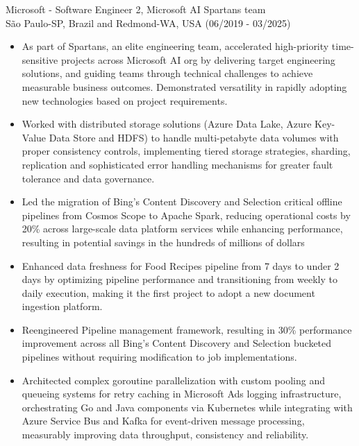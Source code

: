 
\normalsize{Microsoft - Software Engineer 2, Microsoft AI Spartans team}\\
    \scriptsize{São Paulo-SP, Brazil and Redmond-WA, USA (06/2019 - 03/2025)}
\begin{itemize}
    \item \scriptsize{As part of Spartans, an elite engineering team, accelerated high-priority
        time-sensitive projects across Microsoft AI org by delivering target engineering solutions, and
        guiding teams through technical challenges to achieve measurable business outcomes. Demonstrated
        versatility in rapidly adopting new technologies based on project requirements.}

    \item \scriptsize{Worked with distributed storage solutions (Azure Data Lake, Azure Key-Value Data
        Store and HDFS) to handle multi-petabyte data volumes with proper consistency controls,
        implementing tiered storage strategies, sharding, replication and sophisticated error handling
        mechanisms for greater fault tolerance and data governance.}

    \item \scriptsize{Led the migration of Bing's Content Discovery and Selection critical offline
        pipelines from Cosmos Scope to Apache Spark, reducing operational costs by 20\% across
        large-scale data platform services while enhancing performance, resulting in potential savings
        in the hundreds of millions of dollars}

    \item \scriptsize{Enhanced data freshness for Food Recipes pipeline from 7 days to under 2 days by
        optimizing pipeline performance and transitioning from weekly to daily execution, making it the
        first project to adopt a new document ingestion platform.}

    \item \scriptsize{Reengineered Pipeline management framework, resulting in 30\% performance
        improvement across all Bing's Content Discovery and Selection bucketed pipelines without
        requiring modification to job implementations.}

    \item \scriptsize{Architected complex goroutine parallelization with custom pooling and queueing
        systems for retry caching in Microsoft Ads logging infrastructure, orchestrating Go and Java
        components via Kubernetes while integrating with Azure Service Bus and Kafka for event-driven
        message processing, measurably improving data throughput, consistency and reliability.}
    

\end{itemize}
